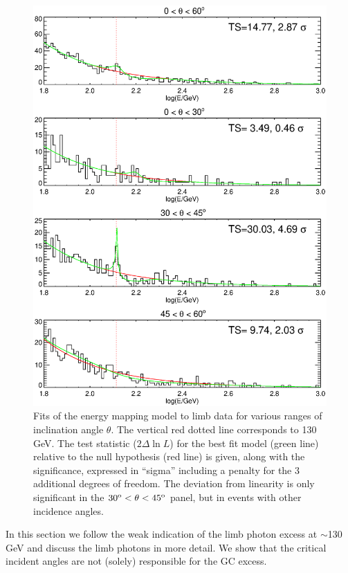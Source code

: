 \documentclass[aps,twocolumn,prd,superscriptaddress,showpacs,nofootinbib,fixfloat]{revtex4}
\newcommand{\degree}{^{\rm o}}
\begin{document}
\begin{figure}
  \centering
  \includegraphics[width=1.0\linewidth]{plots/limbfits.ps}
  \caption{Fits of the energy mapping model to limb data for
  various ranges of inclination angle $\theta$.  The
  vertical red dotted line corresponds to 130 GeV.  The test
  statistic ($2\Delta\ln L$) for the best fit model (green
  line) relative to the null hypothesis (red line) is given,
  along with the significance, expressed in ``sigma''
  including a penalty for the 3 additional degrees of
  freedom.  The deviation from linearity is only significant
  in the $30\degree < \theta < 45\degree$ panel, but in events with other incidence angles.}
  \label{fig:limbfits}
\end{figure}


In this section we follow the weak indication of the limb
photon excess at $\sim$130 GeV and discuss the limb photons
in more detail. We show that the critical incident angles
are not (solely) responsible for the GC excess.
\end{document}
